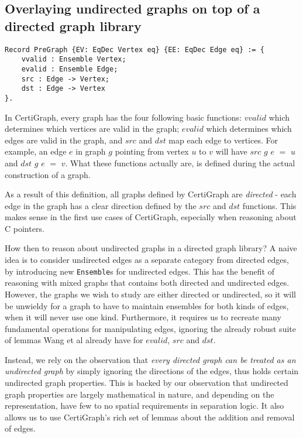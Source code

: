 \subsection{Overlaying undirected graphs on top of a directed graph library}

\begin{lstlisting}
Record PreGraph {EV: EqDec Vertex eq} {EE: EqDec Edge eq} := {
	vvalid : Ensemble Vertex;
	evalid : Ensemble Edge;
	src : Edge -> Vertex;
	dst : Edge -> Vertex
}.
\end{lstlisting}
In CertiGraph, every graph has the four following basic functions: $vvalid$ which determines which vertices are valid in the graph; $evalid$ which determines which edges are valid in the graph, and $src$ and $dst$ map each edge to vertices. For example, an edge $e$ in graph $g$ pointing from vertex $u$ to $v$ will have $src$ $g$ $e$ $=$ $u$ and $dst$ $g$ $e$ $=$ $v$. What these functions actually are, is defined during the actual construction of a graph.

As a result of this definition, all graphs defined by CertiGraph are \textit{directed} - each edge in the graph has a clear direction defined by the $src$ and $dst$ functions. This makes sense in the first use cases of CertiGraph, especially when reasoning about C pointers.

How then to reason about undirected graphs in a directed graph library? A naive idea is to consider undirected edges as a separate category from directed edges, by introducing new \texttt{Ensemble}s for undirected edges. This has the benefit of reasoning with mixed graphs that contains both directed and undirected edges. However, the graphs we wish to study are either directed or undirected, so it will be unwieldy for a graph to have to maintain ensembles for both kinds of edges, when it will never use one kind. Furthermore, it requires us to recreate many fundamental operations for manipulating edges, ignoring the already robust suite of lemmas Wang et al already have for $evalid$, $src$ and $dst$.

Instead, we rely on the observation that \textit{every directed graph can be treated as an undirected graph} by simply ignoring the directions of the edges, thus holds certain undirected graph properties. This is backed by our observation that undirected graph properties are largely mathematical in nature, and depending on the representation, have few to no spatial requirements in separation logic. It also allows us to use CertiGraph's rich set of lemmas about the addition and removal of edges.

